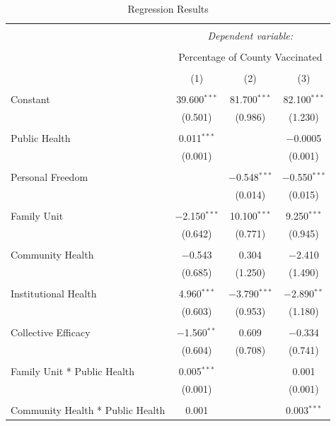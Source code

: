 \documentclass[
]{article}
\begin{document}
\begin{table}[!htbp] \centering 
  \caption{Regression Results} 
  \label{} 
\begin{tabular}{@{\extracolsep{5pt}}lccc} 
\\[-1.8ex]\hline 
\hline \\[-1.8ex] 
 & \multicolumn{3}{c}{\textit{Dependent variable:}} \\ 
\cline{2-4} 
\\[-1.8ex] & \multicolumn{3}{c}{Percentage of County Vaccinated} \\ 
\\[-1.8ex] & (1) & (2) & (3)\\ 
\hline \\[-1.8ex] 
 Constant & 39.600$^{***}$ & 81.700$^{***}$ & 82.100$^{***}$ \\ 
  & (0.501) & (0.986) & (1.230) \\ 
  & & & \\ 
 Public Health & 0.011$^{***}$ &  & $-$0.0005 \\ 
  & (0.001) &  & (0.001) \\ 
  & & & \\ 
 Personal Freedom &  & $-$0.548$^{***}$ & $-$0.550$^{***}$ \\ 
  &  & (0.014) & (0.015) \\ 
  & & & \\ 
 Family Unit & $-$2.150$^{***}$ & 10.100$^{***}$ & 9.250$^{***}$ \\ 
  & (0.642) & (0.771) & (0.945) \\ 
  & & & \\ 
 Community Health & $-$0.543 & 0.304 & $-$2.410 \\ 
  & (0.685) & (1.250) & (1.490) \\ 
  & & & \\ 
 Institutional Health & 4.960$^{***}$ & $-$3.790$^{***}$ & $-$2.890$^{**}$ \\ 
  & (0.603) & (0.953) & (1.180) \\ 
  & & & \\ 
 Collective Efficacy & $-$1.560$^{**}$ & 0.609 & $-$0.334 \\ 
  & (0.604) & (0.708) & (0.741) \\ 
  & & & \\ 
 Family Unit * Public Health & 0.005$^{***}$ &  & 0.001 \\ 
  & (0.001) &  & (0.001) \\ 
  & & & \\ 
 Community Health * Public Health & 0.001 &  & 0.003$^{***}$ \\ 

\end{tabular}
\end{table}
\end{document}
